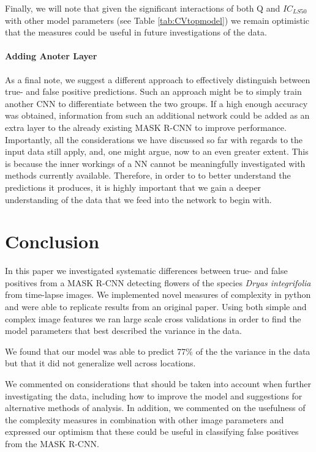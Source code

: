 \documentclass[12pt]{article}
\begin{document}
Finally, we will note that given the significant interactions of both Q and $IC_{LS50}$ with other model parameters (see Table \ref{tab:CVtopmodel}) we remain optimistic that the measures could be useful in future investigations of the data.

\paragraph{Adding Anoter Layer}
As a final note, we suggest a different approach to effectively distinguish between true- and false positive predictions. Such an approach might be to simply train another CNN to differentiate between the two groups. If a high enough accuracy was obtained, information from such an additional network could be added as an extra layer to the already existing MASK R-CNN to improve performance. Importantly, all the considerations we have discussed so far with regards to the input data still apply, and, one might argue, now to an even greater extent. This is because the inner workings of a NN cannot be meaningfully investigated with methods currently available. Therefore, in order to to better understand the predictions it produces, it is highly important that we gain a deeper understanding of the data that we feed into the network to begin with.

\section{Conclusion}
In this paper we investigated systematic differences between true- and false positives from a MASK R-CNN detecting flowers of the species \textit{Dryas integrifolia} from time-lapse images. We implemented novel measures of complexity in python and were able to replicate results from an original paper. Using both simple and complex image features we ran large scale cross validations in order to find the model parameters that best described the variance in the data. 

We found that our model was able to predict 77\% of the the variance in the data but that it did not generalize well across locations. 

We commented on considerations that should be taken into account when further investigating the data, including how to improve the model and suggestions for alternative methods of analysis. In addition, we commented on the usefulness of the complexity measures in combination with other image parameters and expressed our optimism that these could be useful in classifying false positives from the MASK R-CNN.
\end{document}
